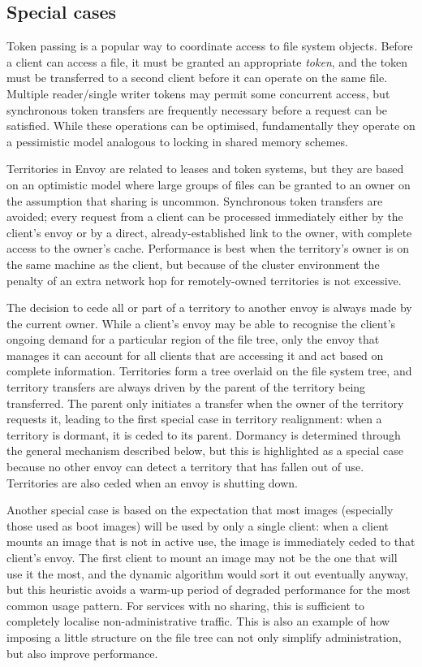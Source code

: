 \subsection{Special cases}

Token passing is a popular way to coordinate access to file system objects. Before a client can access a file, it must be granted an appropriate \emph{token}, and the token must be transferred to a second client before it can operate on the same file. Multiple reader/single writer tokens may permit some concurrent access, but synchronous token transfers are frequently necessary before a request can be satisfied. While these operations can be optimised, fundamentally they operate on a pessimistic model analogous to locking in shared memory schemes.

Territories in Envoy are related to leases and token systems, but they are based on an optimistic model where large groups of files can be granted to an owner on the assumption that sharing is uncommon. Synchronous token transfers are avoided; every request from a client can be processed immediately either by the client's envoy or by a direct, already-established link to the owner, with complete access to the owner's cache. Performance is best when the territory's owner is on the same machine as the client, but because of the cluster environment the penalty of an extra network hop for remotely-owned territories is not excessive.

The decision to cede all or part of a territory to another envoy is always made by the current owner. While a client's envoy may be able to recognise the client's ongoing demand for a particular region of the file tree, only the envoy that manages it can account for all clients that are accessing it and act based on complete information. Territories form a tree overlaid on the file system tree, and territory transfers are always driven by the parent of the territory being transferred. The parent only initiates a transfer when the owner of the territory requests it, leading to the first special case in territory realignment: when a territory is dormant, it is ceded to its parent. Dormancy is determined through the general mechanism described below, but this is highlighted as a special case because no other envoy can detect a territory that has fallen out of use. Territories are also ceded when an envoy is shutting down.

Another special case is based on the expectation that most images (especially those used as boot images) will be used by only a single client: when a client mounts an image that is not in active use, the image is immediately ceded to that client's envoy. The first client to mount an image may not be the one that will use it the most, and the dynamic algorithm would sort it out eventually anyway, but this heuristic avoids a warm-up period of degraded performance for the most common usage pattern. For services with no sharing, this is sufficient to completely localise non-administrative traffic. This is also an example of how imposing a little structure on the file tree can not only simplify administration, but also improve performance.

